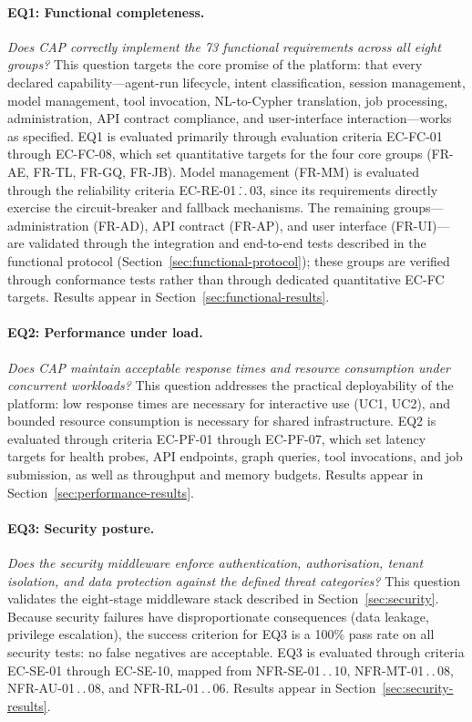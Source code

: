 \documentclass[a4paper]{sapthesis}
\begin{document}
\paragraph{EQ1: Functional completeness.}
\emph{Does CAP correctly implement the 73 functional requirements across
all eight groups?}
This question targets the core promise of the platform: that every declared
capability---agent-run lifecycle, intent classification, session
management, model management, tool invocation, NL-to-Cypher translation,
job processing, administration, API contract compliance, and
user-interface interaction---works as specified.
EQ1 is evaluated primarily through evaluation criteria EC-FC-01 through
EC-FC-08, which set quantitative targets for the four core groups
(FR-AE, FR-TL, FR-GQ, FR-JB).  Model management (FR-MM) is evaluated
through the reliability criteria EC-RE-01\,.\.\,.\,03, since its
requirements directly exercise the circuit-breaker and fallback
mechanisms.  The remaining groups---administration (FR-AD),
API contract (FR-AP), and user interface (FR-UI)---are validated through
the integration and end-to-end tests described in the functional protocol
(Section~\ref{sec:functional-protocol}); these groups are verified
through conformance tests rather than through dedicated quantitative
EC-FC targets.  Results appear in
Section~\ref{sec:functional-results}.

\paragraph{EQ2: Performance under load.}
\emph{Does CAP maintain acceptable response times and resource consumption
under concurrent workloads?}
This question addresses the practical deployability of the platform: low
response times are necessary for interactive use (UC1, UC2), and bounded
resource consumption is necessary for shared infrastructure.  EQ2 is
evaluated through criteria EC-PF-01 through EC-PF-07, which set latency
targets for health probes, API endpoints, graph queries, tool invocations,
and job submission, as well as throughput and memory budgets.  Results
appear in Section~\ref{sec:performance-results}.

\paragraph{EQ3: Security posture.}
\emph{Does the security middleware enforce authentication, authorisation,
tenant isolation, and data protection against the defined threat
categories?}
This question validates the eight-stage middleware stack described in
Section~\ref{sec:security}.  Because security failures have
disproportionate consequences (data leakage, privilege escalation), the
success criterion for EQ3 is a 100\% pass rate on all security tests: no
false negatives are acceptable.  EQ3 is evaluated through criteria
EC-SE-01 through EC-SE-10, mapped from NFR-SE-01\,.\,.\,10,
NFR-MT-01\,.\,.\,08, NFR-AU-01\,.\,.\,08, and NFR-RL-01\,.\,.\,06.
Results appear in Section~\ref{sec:security-results}.
\end{document}
